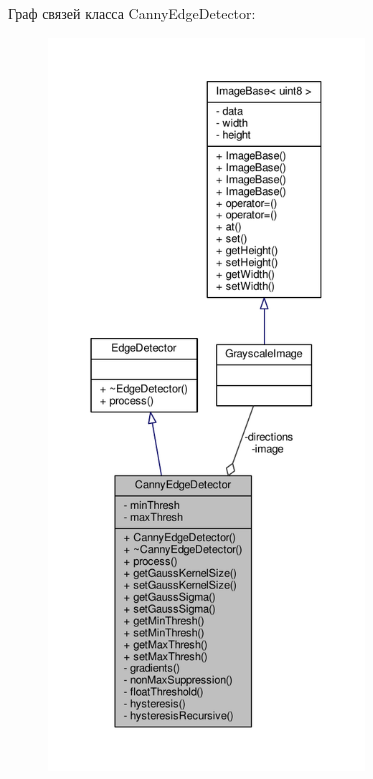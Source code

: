 Граф связей класса Canny\+Edge\+Detector\+:
\nopagebreak
\begin{figure}[H]
\begin{center}
\leavevmode
\includegraphics[height=550pt]{d0/dd8/class_canny_edge_detector__coll__graph}
\end{center}
\end{figure}

